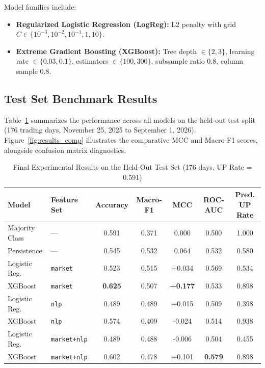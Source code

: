\documentclass[10pt,a4paper]{article}
\begin{document}
Model families include:
\begin{itemize}[leftmargin=1.5em]
    \item \textbf{Regularized Logistic Regression (LogReg):} L2 penalty with grid $C \in \{10^{-3}, 10^{-2}, 10^{-1}, 1, 10\}$.
    \item \textbf{Extreme Gradient Boosting (XGBoost):} Tree depth $\in \{2, 3\}$, learning rate $\in \{0.03, 0.1\}$, estimators $\in \{100, 300\}$, subsample ratio $0.8$, column sample $0.8$.
\end{itemize}

\subsection{Test Set Benchmark Results}
Table~\ref{tab:results} summarizes the performance across all models on the held-out test split (176 trading days, November 25, 2025 to September 1, 2026). Figure~\ref{fig:results_comp} illustrates the comparative MCC and Macro-F1 scores, alongside confusion matrix diagnostics.

\begin{table}[t]
\centering
\footnotesize
\caption{Final Experimental Results on the Held-Out Test Set (176 days, UP Rate = 0.591)}
\label{tab:results}
\begin{tabular}{llccccc}
\toprule
\textbf{Model} & \textbf{Feature Set} & \textbf{Accuracy} & \textbf{Macro-F1} & \textbf{MCC} & \textbf{ROC-AUC} & \textbf{Pred. UP Rate} \\
\midrule
Majority Class & --- & 0.591 & 0.371 & 0.000 & 0.500 & 1.000 \\
Persistence    & --- & 0.545 & 0.532 & 0.064 & 0.532 & 0.580 \\
\midrule
Logistic Reg.  & \texttt{market}     & 0.523 & 0.515 & +0.034 & 0.569 & 0.534 \\
XGBoost        & \texttt{market}     & \textbf{0.625} & 0.507 & \textbf{+0.177} & 0.533 & 0.898 \\
\midrule
Logistic Reg.  & \texttt{nlp}        & 0.489 & 0.489 & +0.015 & 0.509 & 0.398 \\
XGBoost        & \texttt{nlp}        & 0.574 & 0.409 & -0.024 & 0.514 & 0.938 \\
\midrule
Logistic Reg.  & \texttt{market+nlp} & 0.489 & 0.488 & -0.006 & 0.504 & 0.455 \\
XGBoost        & \texttt{market+nlp} & 0.602 & 0.478 & +0.101 & \textbf{0.579} & 0.898 \\
\bottomrule
\end{tabular}
\end{table}
\end{document}
